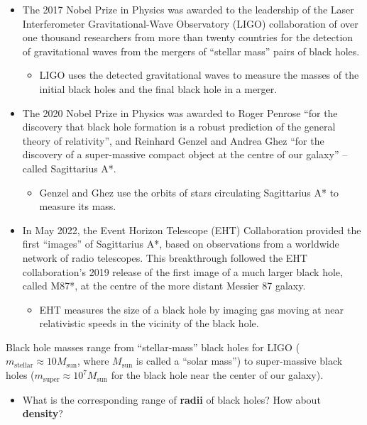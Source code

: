 \documentclass[11pt, letterpaper, openany]{book}
\begin{document}
\begin{itemize}
    \item The 2017 Nobel Prize in Physics was awarded to the leadership of the Laser Interferometer Gravitational-Wave Observatory (LIGO) collaboration of over one thousand researchers from more than twenty countries for the detection of gravitational waves from the mergers of ``stellar mass'' pairs of black holes.
    \begin{itemize}
        \item LIGO uses the detected gravitational waves to measure the masses of the initial black holes and the final black hole in a merger.
    \end{itemize}
    \item The 2020 Nobel Prize in Physics was awarded to Roger Penrose ``for the discovery that black hole formation is a robust prediction of the general theory of relativity'', and Reinhard Genzel and Andrea Ghez ``for the discovery of a super-massive compact object at the centre of our galaxy'' -- called Sagittarius A*.
    \begin{itemize}
        \item Genzel and Ghez use the orbits of stars circulating Sagittarius A* to measure its mass.
    \end{itemize}
    \item In May 2022, the Event Horizon Telescope (EHT) Collaboration provided the first ``images'' of Sagittarius A*, based on observations from a worldwide network of radio telescopes. This breakthrough followed the EHT collaboration's 2019 release of the first image of a much larger black hole, called M87*, at the centre of the more distant Messier 87 galaxy.
    \begin{itemize}
        \item EHT measures the size of a black hole by imaging gas moving at near relativistic speeds in the vicinity of the black hole.
    \end{itemize}
\end{itemize}

Black hole masses range from ``stellar-mass'' black holes for LIGO ($m_{\text{stellar}} \approx 10M_{\text{sun}}$, where $M_{\text{sun}}$ is called a ``solar mass'') to super-massive black holes ($m_{\text{super}} \approx 10^7M_{\text{sun}}$ for the black hole near the center of our galaxy).
\begin{itemize}
    \item What is the corresponding range of \textbf{radii} of black holes? How about \textbf{density}?
\end{itemize}
\end{document}
